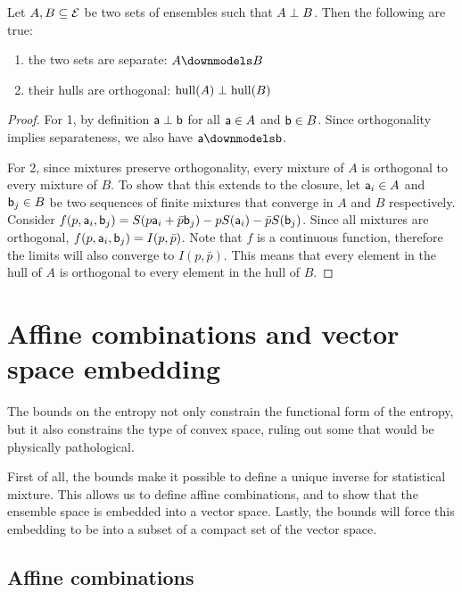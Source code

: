\begin{mathSection}
\begin{prop}
	Let $A, B \subseteq \Ens$ be two sets of ensembles such that $A \ortho B$. Then the following are true:
	\begin{enumerate}
		\item the two sets are separate: $A \separate B$
		\item their hulls are orthogonal: $\hull(A) \ortho \hull(B)$
	\end{enumerate}
\end{prop}

\begin{proof}
	For 1, by definition $\ens[a] \ortho \ens[b]$ for all $\ens[a] \in A$ and $\ens[b] \in B$. Since orthogonality implies separateness, we also have $\ens[a] \separate \ens[b]$.
	
	For 2, since mixtures preserve orthogonality, every mixture of $A$ is orthogonal to every mixture of $B$. To show that this extends to the closure, let $\ens[a]_i \in A$ and $\ens[b]_j \in B$ be two sequences of finite mixtures that converge in $A$ and $B$ respectively. Consider $f(p,\ens[a]_i, \ens[b]_j) = S(p \ens[a]_i + \bar{p} \ens[b]_j) - p S(\ens[a]_i) - \bar{p} S(\ens[b]_j)$. Since all mixtures are orthogonal, $f(p,\ens[a]_i, \ens[b]_j) = I(p,\bar{p})$. Note that $f$ is a continuous function, therefore the limits will also converge to $I(p,\bar{p})$. This means that every element in the hull of $A$ is orthogonal to every element in the hull of $B$.
\end{proof}
\end{mathSection}

\section{Affine combinations and vector space embedding}

The bounds on the entropy not only constrain the functional form of the entropy, but it also constrains the type of convex space, ruling out some that would be physically pathological.

First of all, the bounds make it possible to define a unique inverse for statistical mixture. This allows us to define affine combinations, and to show that the ensemble space is embedded into a vector space. Lastly, the bounds will force this embedding to be into a subset of a compact set of the vector space.

\subsection{Affine combinations}

